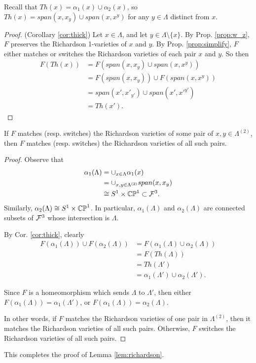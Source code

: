 Recall that $Th(x) = \alpha_1(x) \cup \alpha_2(x)$, 
so $Th(x) = span(x,x_y) \cup span(x,x^y)$ 
for any $y \in \Lambda$ distinct from $x$. 
\begin{proof}(Corollary \ref{cor:thick})
    Let $x \in \Lambda$, and let $y\in\Lambda \setminus \{x\}$. 
    By Prop. \ref{prop:w_z}, $F$ preserves the Richardson 1-varieties of $x$ and $y$.
    By Prop. \ref{prop:simplify}, $F$ either matches or switches 
    the Richardson varieties of each pair $x$ and $y$.
    So then 
    \begin{align}
        F(Th(x)) &= F(span(x,x_y) \cup span(x,x^y)) \\
        &= F(span(x, x_y)) \cup F(span(x,x^y)) \\
        &= span(x',x'_{y'}) \cup span(x',x'^{y'}) \\
        &= Th(x').
    \end{align}
\end{proof}

\begin{prop}
    If $F$ matches (resp. switches) the Richardson varieties of some pair of $x,y \in \Lambda^{(2)}$,
    then $F$ matches (resp. switches) the Richardson varieties of all such pairs.
\end{prop}
\begin{proof}
    Observe that 
    \begin{align}
        \alpha_1(\Lambda) 
        &= \cup_{x \in \Lambda} \alpha_1(x) \\
        &= \cup_{x,y \in \Lambda^{(2)}} span(x,x_y) \\
        &\cong S^1 \times \mathbb{CP}^1 \subset \mathcal{F}^3.
    \end{align}
    Similarly, $\alpha_2(\Lambda) \cong S^1 \times \mathbb{CP}^1$.
    In particular, $\alpha_1(\Lambda)$ and $\alpha_2(\Lambda)$ are connected subsets of $\mathcal{F}^3$
    whose intersection is $\Lambda$.

    By Cor. \ref{cor:thick}, clearly 
    \begin{align}
        F(\alpha_1(\Lambda)) \cup F(\alpha_2(\Lambda)) 
        &= F(\alpha_1(\Lambda) \cup \alpha_2(\Lambda)) \\
        &= F(Th(\Lambda)) \\
        &= Th(\Lambda') \\
        &= \alpha_1(\Lambda') \cup \alpha_2(\Lambda').
    \end{align}

    Since $F$ is a homeomorphism which sends $\Lambda$ to $\Lambda'$, 
    then either $F(\alpha_1(\Lambda)) = \alpha_1(\Lambda')$,
    or $F(\alpha_1(\Lambda)) = \alpha_2(\Lambda)$.
    
    In other words, if $F$ matches the Richardson varieties of one pair in $\Lambda^{(2)}$, 
    then it matches the Richardson varieties of all such pairs.
    Otherwise, $F$ switches the Richardson varieties of all such pairs.
\end{proof}
This completes the proof of Lemma \ref{lem:richardson}. 

